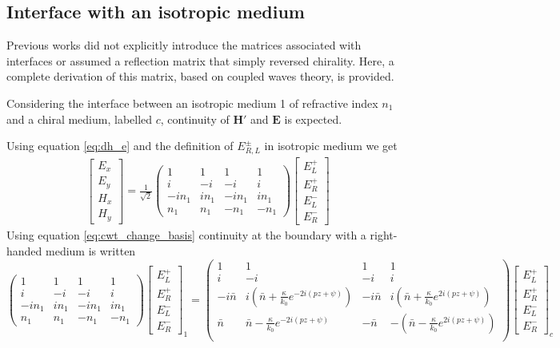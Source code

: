 \subsection{Interface with an isotropic medium}
\label{sec:interface_iso}
Previous works\cite{mccall_properties_2009} did not explicitly introduce the matrices associated with interfaces or assumed a reflection matrix that simply reversed chirality. Here, a complete derivation of this matrix, based on coupled waves theory, is provided. 

Considering the interface between an isotropic medium 1 of refractive index $n_1$ and a chiral medium, labelled $c$, continuity of $\bm{H'}$ and $\bm{E}$ is expected.

Using equation \ref{eq:dh_e} and the definition of $E^\pm_{R,L}$ in isotropic medium we get
\begin{eqnarray}
\begin{bmatrix}
E_x\\E_y\\H_x\\H_y
\end{bmatrix} = \frac{1}{\sqrt{2}}\begin{pmatrix}
1 & 1 & 1 & 1\\
i & -i & -i & i\\
-in_1 & in_1 & -in_1 & in_1\\
n_1 & n_1 & -n_1 & -n_1
\end{pmatrix}\begin{bmatrix}
E_L^+\\E_R^+\\E_L^-\\E_R^-
\end{bmatrix}
\end{eqnarray}
Using equation \ref{eq:cwt_change_basis} continuity at the boundary with a right-handed medium is written
\begin{equation}
\begin{pmatrix}
1 & 1 & 1 & 1\\
i & -i & -i & i\\
-in_1 & in_1 & -in_1 & in_1\\
n_1 & n_1 & -n_1 & -n_1
\end{pmatrix}\begin{bmatrix}
E_L^+\\E_R^+\\E_L^-\\E_R^-
\end{bmatrix}_1 = \begin{pmatrix}
1 & 1 & 1 & 1\\
i &-i &-i & i\\
-i\bar{n} & i(\bar{n}+\frac{\kappa}{k_0}e^{-2i(pz+\psi)}) & -i\bar{n} & i(\bar{n}+\frac{\kappa}{k_0} e^{2i(pz+\psi)}) \\
\bar{n} & \bar{n}-\frac{\kappa}{k_0} e^{-2i(pz+\psi)} & -\bar{n} & -(\bar{n}-\frac{\kappa}{k_0} e^{2i(pz+\psi)}) \\
\end{pmatrix}\begin{bmatrix}
E_L^+\\E_R^+\\E_L^-\\E_R^-
\end{bmatrix}_c
\end{equation}
